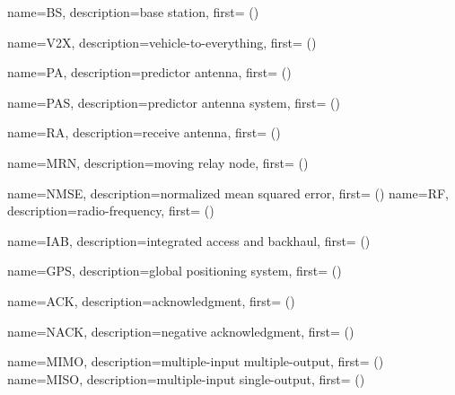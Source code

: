 {
  name={BS},
  description={base station},
  first={ ()}
}

{
  name={V2X},
  description={vehicle-to-everything},
  first={ ()}
}

{
  name={PA},
  description={predictor antenna},
  first={ ()}
}


{
  name={PAS},
  description={predictor antenna system},
  first={ ()}
}

{
  name={RA},
  description={receive antenna},
  first={ ()}
}





{
  name={MRN},
  description={moving relay node},
  first={ ()}
}



{
  name={NMSE},
  description={normalized mean squared error},
  first={ ()}
}
{
  name={RF},
  description={radio-frequency},
  first={ ()}
}

{
  name={IAB},
  description={integrated access and backhaul},
  first={ ()}
}




{
  name={GPS},
  description={global positioning system},
  first={ ()}
}

{
  name={ACK},
  description={acknowledgment},
  first={ ()}
}

{
  name={NACK},
  description={negative acknowledgment},
  first={ ()}
}

{
  name={MIMO},
  description={multiple-input multiple-output},
  first={ ()}
}
{
  name={MISO},
  description={multiple-input single-output},
  first={ ()}
}

